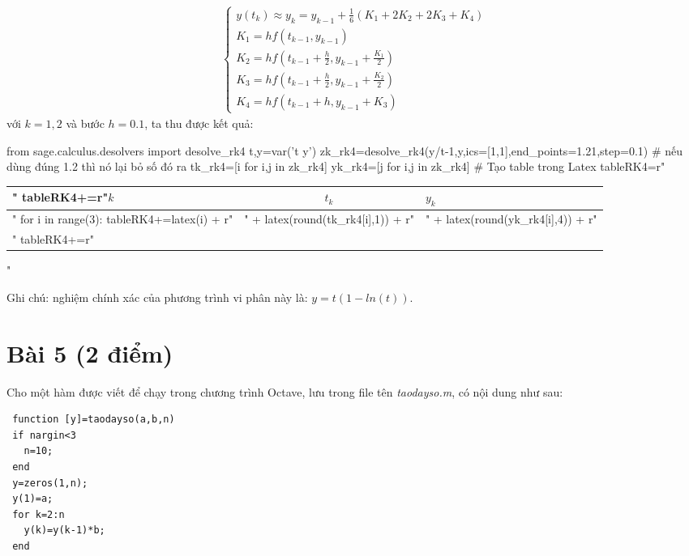\documentclass[12pt]{article}
\begin{document}
\begin{enumerate}[a).]
\begin{align*}
\left\lbrace \begin{array}{l}
               y(t_k) \approx y_k = y_{k-1} + \frac{1}{6}(K_1 + 2K_2 + 2K_3 + K_4) \\
               K_1 = h f(t_{k-1},y_{k-1}) \\
               K_2 = h f\left(t_{k-1}+\frac{h}{2},y_{k-1} + \frac{K_1}{2}\right) \\
               K_3 = h f\left(t_{k-1}+\frac{h}{2},y_{k-1} + \frac{K_2}{2}\right) \\
               K_4 = h f\left(t_{k-1}+h,y_{k-1} + K_3\right)
               \end{array}
\right.
\end{align*}
với $k=1, 2$ và bước $h=0.1$, ta thu được kết quả:
\begin{sagesilent}
 from sage.calculus.desolvers import desolve_rk4
 t,y=var('t y')
 zk_rk4=desolve_rk4(y/t-1,y,ics=[1,1],end_points=1.21,step=0.1) # nếu dùng đúng 1.2 thì nó lại bỏ số đó ra
 tk_rk4=[i for i,j in zk_rk4]
 yk_rk4=[j for i,j in zk_rk4]
 # Tạo table trong Latex
 tableRK4=r"\begin{tabular}{l|c|l}"
 tableRK4+=r"$k$ & $t_k$ & $y_k$ \\ \hline"
 for i in range(3):
   tableRK4+=latex(i) + r"&" + latex(round(tk_rk4[i],1)) + r"&" + latex(round(yk_rk4[i],4)) + r"\\"
 tableRK4+=r"\end{tabular}"
\end{sagesilent}

  \begin{center}  \end{center} 

  Ghi chú: nghiệm chính xác của phương trình vi phân này là: $y=t(1-ln(t))$.

\end{enumerate}

\section{Bài 5 (2 điểm)}

Cho một hàm được viết để chạy trong chương trình Octave, lưu trong file tên \textit{taodayso.m}, có nội dung như sau:
\begin{verbatim}
 function [y]=taodayso(a,b,n)
 if nargin<3
   n=10;
 end
 y=zeros(1,n);
 y(1)=a;
 for k=2:n
   y(k)=y(k-1)*b;
 end
\end{verbatim}
\end{document}
